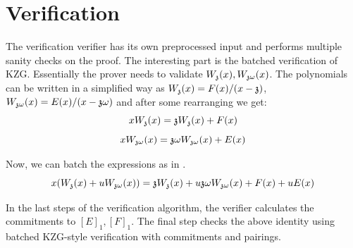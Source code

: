 \section{Verification}
\label{sec:verification}

The verification verifier has its own preprocessed input and performs multiple sanity checks on the proof. The interesting part is the batched verification of KZG. Essentially the prover needs to validate $W_{\mathfrak{z}}(x), W_{\mathfrak{z}\omega}(x)$. The polynomials can be written in a simplified way as $W_{\mathfrak{z}}(x) = F(x) / (x - \mathfrak{z})$, $W_{\mathfrak{z}\omega}(x) = E(x) / (x - \mathfrak{z}\omega)$ and after some rearranging we get:
\begin{equation}
    xW_{\mathfrak{z}}(x) = \mathfrak{z} W_{\mathfrak{z}}(x) + F(x)
\end{equation}
\begin{equation}
    \label{batch-equation}
    xW_{\mathfrak{z}\omega}(x) = \mathfrak{z}\omega W_{\mathfrak{z}\omega}(x) + E(x)
\end{equation}

Now, we can batch the expressions as in .
\begin{equation}
    x(W_{\mathfrak{z}}(x) + uW_{\mathfrak{z}\omega}(x)) = \mathfrak{z} W_{\mathfrak{z}}(x) + u\mathfrak{z}\omega W_{\mathfrak{z}\omega}(x) + F(x) + uE(x)
\end{equation}

In the last steps of the verification algorithm, the verifier calculates the commitments to $[E]_1, [F]_1$. The final step checks the above identity using batched KZG-style verification with commitments and pairings.











